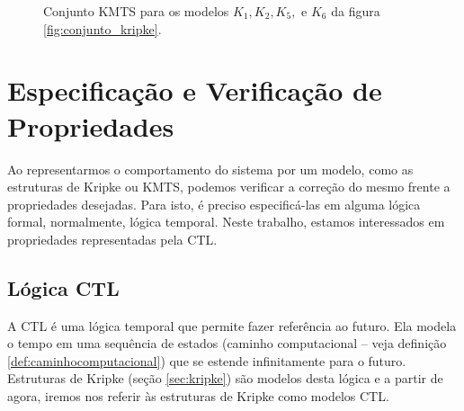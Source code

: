\documentclass[normaltoc,capchap,capsec,times]{abnt}
\begin{document}
\begin{figure}[htb]
\begin{center}
\end{center}
\centering \caption{ Conjunto KMTS para os modelos $K_1, K_2, K_5,$ e $K_6$ da figura \ref{fig:conjunto_kripke}.}
\label{fig:kmts2}
\end{figure}

\section{Especificação e Verificação de Propriedades}

Ao representarmos o comportamento do sistema por um modelo, como as estruturas de Kripke ou KMTS, podemos verificar a correção do mesmo frente a propriedades desejadas. Para isto, é preciso especificá-las em alguma lógica formal, normalmente, lógica temporal. Neste trabalho, estamos interessados em propriedades representadas pela CTL.

\subsection{Lógica CTL}

A CTL é uma lógica temporal que permite fazer referência ao futuro. Ela modela o tempo em uma sequência de estados (caminho computacional -- veja definição \ref{def:caminhocomputacional}) que se estende infinitamente para o futuro. Estruturas de Kripke (seção \ref{sec:kripke}) são modelos desta lógica e a partir de agora, iremos nos referir às estruturas de Kripke como modelos CTL. 
\end{document}
